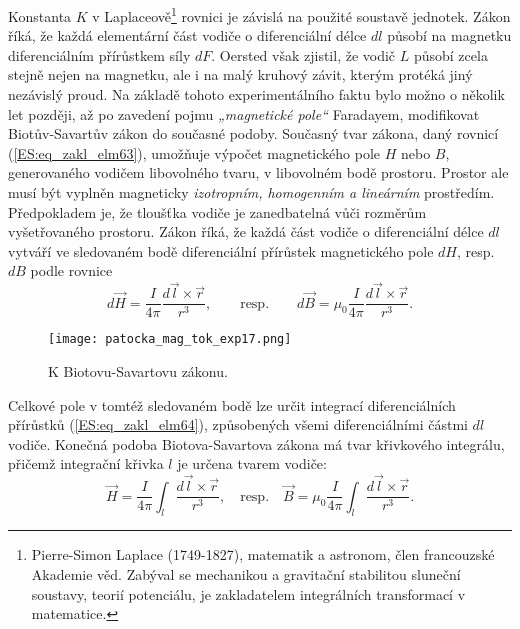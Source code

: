     Konstanta \(K\) v Laplaceově\footnote{Pierre-Simon Laplace (1749-1827), matematik a astronom, 
    člen francouzské Akademie věd. Zabýval se mechanikou a gravitační stabilitou sluneční soustavy, 
    teorií potenciálu, je zakladatelem integrálních transformací v matematice.} rovnici je závislá 
    na použité soustavě jednotek. Zákon říká, že každá elementární část vodiče o diferenciální 
    délce \(dl\) působí na magnetku diferenciálním přírůstkem síly \(dF\). Oersted však zjistil, že 
    vodič \(L\) působí zcela stejně nejen na magnetku, ale i na malý kruhový závit, kterým protéká 
    jiný nezávislý proud. Na základě tohoto experimentálního faktu bylo možno o několik let 
    později, až po zavedení pojmu \emph{„magnetické pole“} Faradayem, modifikovat Biotův-Savartův 
    zákon do současné podoby. Současný tvar zákona, daný rovnicí (\ref{ES:eq_zakl_elm63}), umožňuje 
    výpočet magnetického pole \(H\) nebo \(B\), generovaného vodičem libovolného tvaru, v 
    libovolném bodě prostoru. Prostor ale musí být vyplněn magneticky \emph{izotropním, homogenním 
    a lineárním} prostředím. Předpokladem je, že tloušťka vodiče je zanedbatelná vůči rozměrům 
    vyšetřovaného prostoru. Zákon říká, že každá část vodiče o diferenciální délce \(dl\) vytváří 
    ve sledovaném bodě diferenciální přírůstek magnetického pole \(dH\), resp. \(dB\) podle rovnice
    \begin{equation}\label{ES:eq_zakl_elm64}
      d\vec{H} = \frac{I}{4\pi}\frac{d\vec{l}\times \vec{r}}{r^3}, \qquad\text{resp.}\qquad
      d\vec{B} = \mu_0\frac{I}{4\pi}\frac{d\vec{l}\times \vec{r}}{r^3}.
    \end{equation}     
    \begin{figure}[ht!]
      \centering
      \texttt{[image: patocka\_mag\_tok\_exp17.png]}
      \caption{K Biotovu-Savartovu zákonu.}
      \label{es:fig_patocka_mag_tok_exp17}
    \end{figure}
    Celkové pole v tomtéž sledovaném bodě lze určit integrací diferenciálních přírůstků 
    (\ref{ES:eq_zakl_elm64}), způsobených všemi diferenciálními částmi \(dl\) vodiče. Konečná 
    podoba Biotova-Savartova zákona má tvar křivkového integrálu, přičemž integrační křivka \(l\) 
    je určena tvarem vodiče:
    \begin{equation}\label{ES:eq_zakl_elm65}
      \vec{H} = \frac{I}{4\pi}\int_l\frac{d\vec{l}\times \vec{r}}{r^3}, \quad\text{resp.}\quad
      \vec{B} = \mu_0\frac{I}{4\pi}\int_l\frac{d\vec{l}\times \vec{r}}{r^3}.
    \end{equation} 
    
